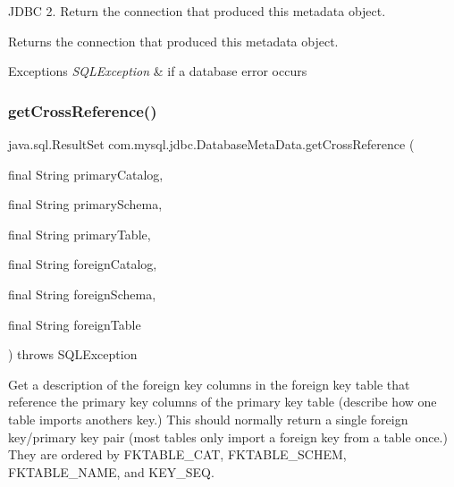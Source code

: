 J\+D\+BC 2. Return the connection that produced this metadata object.

\begin{DoxyReturn}{Returns}
the connection that produced this metadata object. 
\end{DoxyReturn}

\begin{DoxyExceptions}{Exceptions}
{\em S\+Q\+L\+Exception} & if a database error occurs \\
\hline
\end{DoxyExceptions}
\mbox{\label{classcom_1_1mysql_1_1jdbc_1_1_database_meta_data_a0dfb6635800405515c2e66a71a50f235}} 
\subsubsection{\texorpdfstring{get\+Cross\+Reference()}{getCrossReference()}}
{\footnotesize\ttfamily java.\+sql.\+Result\+Set com.\+mysql.\+jdbc.\+Database\+Meta\+Data.\+get\+Cross\+Reference (\begin{DoxyParamCaption}\item[{final String}]{primary\+Catalog,  }\item[{final String}]{primary\+Schema,  }\item[{final String}]{primary\+Table,  }\item[{final String}]{foreign\+Catalog,  }\item[{final String}]{foreign\+Schema,  }\item[{final String}]{foreign\+Table }\end{DoxyParamCaption}) throws S\+Q\+L\+Exception}

Get a description of the foreign key columns in the foreign key table that reference the primary key columns of the primary key table (describe how one table imports another\textquotesingle{}s key.) This should normally return a single foreign key/primary key pair (most tables only import a foreign key from a table once.) They are ordered by F\+K\+T\+A\+B\+L\+E\+\_\+\+C\+AT, F\+K\+T\+A\+B\+L\+E\+\_\+\+S\+C\+H\+EM, F\+K\+T\+A\+B\+L\+E\+\_\+\+N\+A\+ME, and K\+E\+Y\+\_\+\+S\+EQ. 

